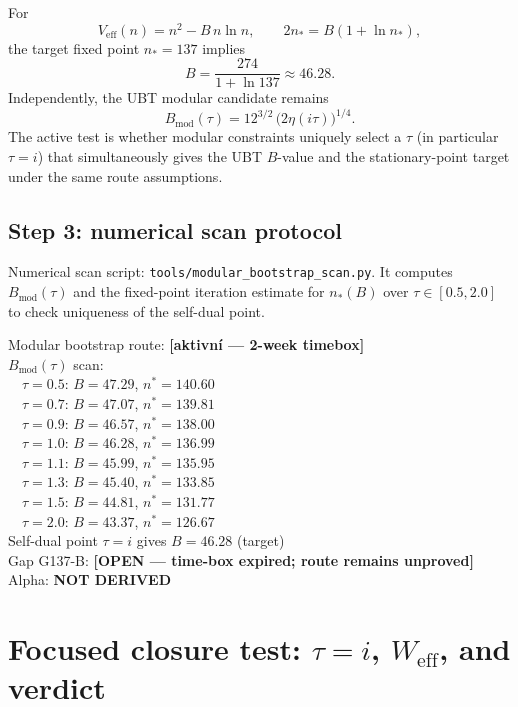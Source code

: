 \documentclass[12pt,a4paper]{article}
\begin{document}
For
\[
V_{\mathrm{eff}}(n)=n^2-B\,n\ln n,\qquad
2n_*=B(1+\ln n_*),
\]
the target fixed point $n_*=137$ implies
\[
B=\frac{274}{1+\ln 137}\approx 46.28.
\]
Independently, the UBT modular candidate remains
\[
B_{\mathrm{mod}}(\tau)=12^{3/2}\,\bigl(2\eta(i\tau)\bigr)^{1/4}.
\]
The active test is whether modular constraints uniquely select a $\tau$ (in
particular $\tau=i$) that simultaneously gives the UBT $B$-value and the
stationary-point target under the same route assumptions.

\subsection*{Step 3: numerical scan protocol}

Numerical scan script: \texttt{tools/modular\_bootstrap\_scan.py}.  It computes
$B_{\mathrm{mod}}(\tau)$ and the fixed-point iteration estimate for $n_*(B)$ over
$\tau\in[0.5,2.0]$ to check uniqueness of the self-dual point.

\begin{statusbox}
Modular bootstrap route: \textbf{[aktivní — 2-week timebox]}\\
$B_{\mathrm{mod}}(\tau)$ scan: \\
\ \ $\tau=0.5$: $B=47.29$, $n^*=140.60$\\
\ \ $\tau=0.7$: $B=47.07$, $n^*=139.81$\\
\ \ $\tau=0.9$: $B=46.57$, $n^*=138.00$\\
\ \ $\tau=1.0$: $B=46.28$, $n^*=136.99$\\
\ \ $\tau=1.1$: $B=45.99$, $n^*=135.95$\\
\ \ $\tau=1.3$: $B=45.40$, $n^*=133.85$\\
\ \ $\tau=1.5$: $B=44.81$, $n^*=131.77$\\
\ \ $\tau=2.0$: $B=43.37$, $n^*=126.67$\\
Self-dual point $\tau=i$ gives $B=46.28$ (target)\\
Gap G137-B: \textbf{[OPEN — time-box expired; route remains unproved]}\\
Alpha: \textbf{NOT DERIVED}
\end{statusbox}

\section{Focused closure test: \(\tau=i\), \(W_{\mathrm{eff}}\), and verdict}
\label{sec:taui_focus}
\end{document}
